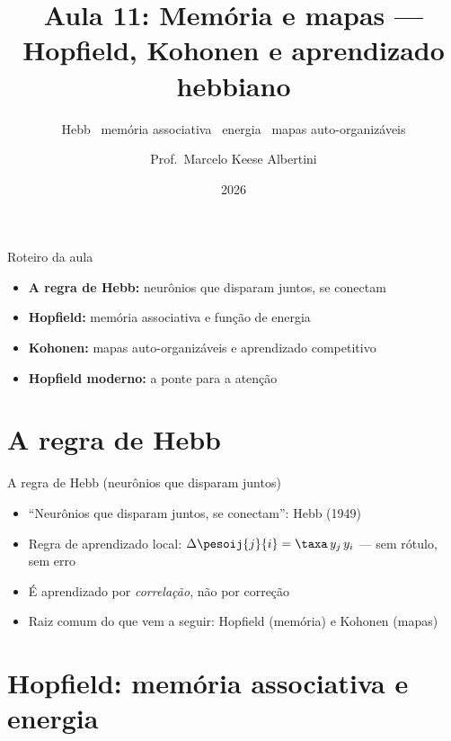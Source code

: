 \documentclass[aspectratio=169, 11pt]{beamer}
\title[Aula 11 — Hopfield e Kohonen]{Aula 11: Memória e mapas — Hopfield, Kohonen e aprendizado hebbiano}
\subtitle[GBC073 — Inteligência Computacional]{Hebb \textbullet\ memória associativa \textbullet\ energia \textbullet\ mapas auto-organizáveis}
\author[Prof.\ Marcelo Albertini]{Prof.\ Marcelo Keese Albertini}
\institute{GBC073 — Inteligência Computacional \textbullet\ Universidade Federal de Uberlândia}
\date{2026}
\begin{document}
\begin{frame}
  \titlepage
\end{frame}

\begin{frame}{Roteiro da aula}
  \begin{itemize}\setlength{\itemsep}{0.5ex}
    \item<1-> \textbf{A regra de Hebb:} neurônios que disparam juntos, se conectam
    \item<2-> \textbf{Hopfield:} memória associativa e função de energia
    \item<3-> \textbf{Kohonen:} mapas auto-organizáveis e aprendizado competitivo
    \item<4-> \textbf{Hopfield moderno:} a ponte para a atenção
  \end{itemize}
\end{frame}

\section{A regra de Hebb}

\begin{frame}{A regra de Hebb (neurônios que disparam juntos)}
  \begin{itemize}\setlength{\itemsep}{0.4ex}
    \item ``Neurônios que disparam juntos, se conectam'': Hebb (1949)
    \item Regra de aprendizado local: \(\Delta \pesoij{j}{i} = \taxa\, y_j\, y_i\)
          — sem rótulo, sem erro
    \item É aprendizado por \emph{correlação}, não por correção
    \item Raiz comum do que vem a seguir: Hopfield (memória) e Kohonen
          (mapas)
  \end{itemize}
\end{frame}

\section{Hopfield: memória associativa e energia}
\end{document}
